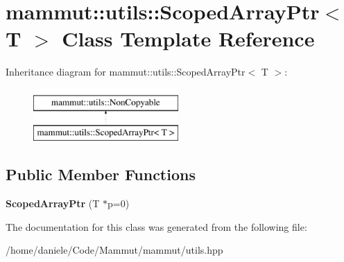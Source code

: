 \hypertarget{classmammut_1_1utils_1_1ScopedArrayPtr}{\section{mammut\-:\-:utils\-:\-:Scoped\-Array\-Ptr$<$ T $>$ Class Template Reference}
\label{classmammut_1_1utils_1_1ScopedArrayPtr}
}
Inheritance diagram for mammut\-:\-:utils\-:\-:Scoped\-Array\-Ptr$<$ T $>$\-:\begin{figure}[H]
\begin{center}
\leavevmode
\includegraphics[height=2.000000cm]{classmammut_1_1utils_1_1ScopedArrayPtr}
\end{center}
\end{figure}
\subsection*{Public Member Functions}
\begin{DoxyCompactItemize}
\item 
\hypertarget{classmammut_1_1utils_1_1ScopedArrayPtr_ab591e38833fc647d0d5777c18ae118cf}{{\bfseries Scoped\-Array\-Ptr} (T $\ast$p=0)}\label{classmammut_1_1utils_1_1ScopedArrayPtr_ab591e38833fc647d0d5777c18ae118cf}

\end{DoxyCompactItemize}


The documentation for this class was generated from the following file\-:\begin{DoxyCompactItemize}
\item 
/home/daniele/\-Code/\-Mammut/mammut/utils.\-hpp\end{DoxyCompactItemize}
